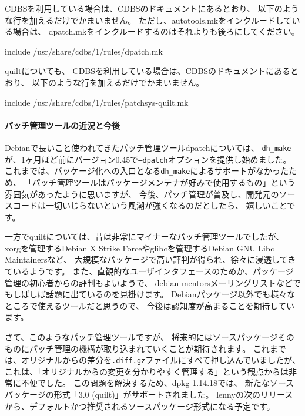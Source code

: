 \documentclass[mingoth,a4paper]{jsarticle}
\begin{document}
CDBSを利用している場合は、CDBSのドキュメントにあるとおり、
以下のような行を加えるだけでかまいません。
ただし、autotools.mkをインクルードしている場合は、
dpatch.mkをインクルードするのはそれよりも後ろにしてください。

\begin{commandline}
include /usr/share/cdbs/1/rules/dpatch.mk
\end{commandline}

quiltについても、
CDBSを利用している場合は、CDBSのドキュメントにあるとおり、
以下のような行を加えるだけでかまいません。

\begin{commandline}
include /usr/share/cdbs/1/rules/patchsys-quilt.mk
\end{commandline}

\begin{screen}
\paragraph*{パッチ管理ツールの近況と今後}

Debianで長いこと使われてきたパッチ管理ツールdpatchについては、
\texttt{dh\_make}が、1ヶ月ほど前にバージョン0.45で\texttt{--dpatch}オプションを提供し始めました。
これまでは、パッケージ化への入口となる\texttt{dh\_make}によるサポートがなかったため、
「パッチ管理ツールはパッケージメンテナが好みで使用するもの」という雰囲気があったように思いますが、
今後、パッチ管理が普及し、開発元のソースコードは一切いじらないという風潮が強くなるのだとしたら、
嬉しいことです。

一方でquiltについては、昔は非常にマイナーなパッチ管理ツールでしたが、
xorgを管理するDebian X Strike Forceやglibcを管理するDebian GNU Libc Maintainersなど、
大規模なパッケージで高い評判が得られ、徐々に浸透してきているようです。
また、直観的なユーザインタフェースのためか、パッケージ管理の初心者からの評判もよいようで、
debian-mentorsメーリングリストなどでもしばしば話題に出ているのを見掛けます。
Debianパッケージ以外でも様々なところで使えるツールだと思うので、
今後は認知度が高まることを期待しています。

さて、このようなパッチ管理ツールですが、
将来的にはソースパッケージそのものにパッチ管理の機構が取り込まれていくことが期待されます。
これまでは、オリジナルからの差分を\texttt{.diff.gz}ファイルにすべて押し込んでいましたが、
これは、「オリジナルからの変更を分かりやすく管理する」という観点からは非常に不便でした。
この問題を解決するため、dpkg 1.14.18では、
新たなソースパッケージの形式「3.0 (quilt)」がサポートされました。
lennyの次のリリースから、デフォルトかつ推奨されるソースパッケージ形式になる予定です。


\end{screen}
\end{document}

